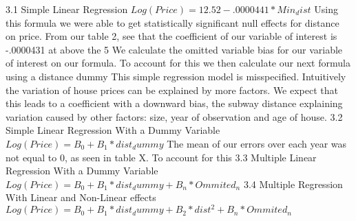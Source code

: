 3.1 Simple Linear Regression
$Log(Price)=12.52-.0000441*Min_dist$
Using this formula we were able to get statistically significant null effects for distance on price. From our table 2, see that the coefficient of our variable of interest is -.0000431 at above the 5%
We calculate the omitted variable bias for our variable of interest on our formula. To account for this we then calculate our next formula using a distance dummy 
This simple regression model is misspecified. Intuitively the variation of house prices can be explained by more factors. We expect that this leads to a coefficient with a downward bias, the subway distance explaining variation caused by other factors: size, year of observation and age of house. 
3.2 Simple Linear Regression With a Dummy Variable
$Log(Price)=B_0+B_1*dist_dummy$
The mean of our errors over each year was not equal to 0, as seen in table X. To account for this
3.3 Multiple Linear Regression With a Dummy Variable
$Log(Price)=B_0+B_1*dist_dummy+B_n*Ommited_n$
3.4 Multiple Regression With Linear and Non-Linear effects
$Log(Price)=B_0+B_1*dist_dummy+B_2*dist^2+B_n*Ommited_n$